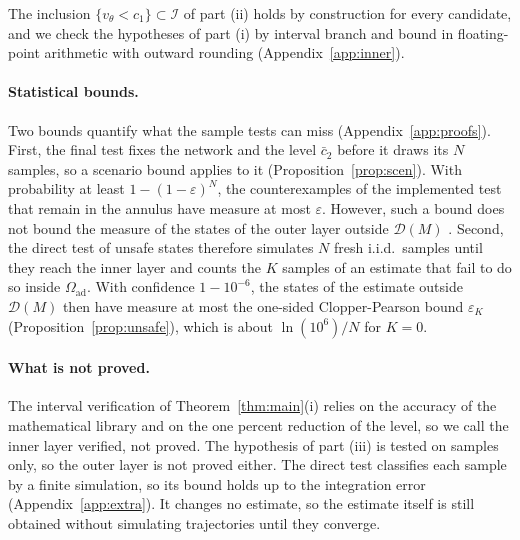 \documentclass{l4dc2027}
\newcommand{\Oad}{\Omega_{\mathrm{ad}}}
\newcommand{\D}{\mathcal D}
\newcommand{\I}{\mathcal I}
\begin{document}
 The inclusion $\{v_\theta<c_1\}\subset\I$ of part (ii) holds by construction for every candidate, and we check the hypotheses of part (i) by interval branch and bound \citep{moore2009} in floating-point arithmetic with outward rounding (Appendix~\ref{app:inner}).

\vspace{-0.075in}

\paragraph{Statistical bounds.} Two bounds quantify what the sample tests can miss (Appendix~\ref{app:proofs}). First, the final test fixes the network and the level $\bar c_2$ before it draws its $N$ samples, so a scenario bound applies to it (Proposition~\ref{prop:scen}). With probability at least $1-(1-\varepsilon)^N$, the counterexamples of the implemented test that remain in the annulus have measure at most $\varepsilon$. However, such a bound does not bound the measure of the states of the outer layer outside $\D(M)$ \citep{kenanian2019}. Second, the direct test of unsafe states therefore simulates $N$ fresh i.i.d.\ samples until they reach the inner layer and counts the $K$ samples of an estimate that fail to do so inside $\Oad$. With confidence $1-10^{-6}$, the states of the estimate outside $\D(M)$ then have measure at most the one-sided Clopper-Pearson bound $\varepsilon_K$ (Proposition~\ref{prop:unsafe}), which is about $\ln(10^6)/N$ for $K=0$.

\vspace{-0.075in}

\paragraph{What is not proved.} The interval verification of Theorem~\ref{thm:main}(i) relies on the accuracy of the mathematical library and on the one percent reduction of the level, so we call the inner layer verified, not proved. The hypothesis of part (iii) is tested on samples only, so the outer layer is not proved either. The direct test classifies each sample by a finite simulation, so its bound holds up to the integration error (Appendix~\ref{app:extra}). It changes no estimate, so the estimate itself is still obtained without simulating trajectories until they converge.

\vspace{-0.1in}
\end{document}
